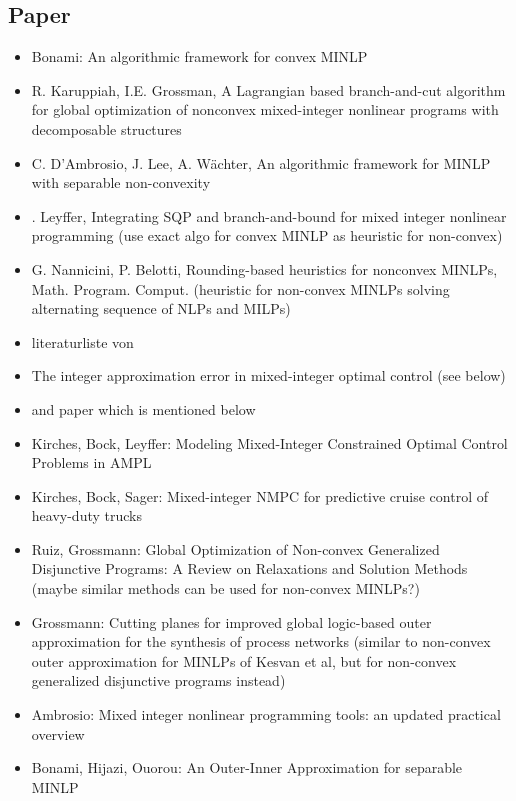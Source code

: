 \documentclass{article}
\begin{document}
\subsection{Paper}
\begin{itemize}
\item Bonami: An algorithmic framework for convex MINLP
\item R. Karuppiah, I.E. Grossman, A Lagrangian based branch-and-cut algorithm
for global optimization of nonconvex mixed-integer nonlinear programs
with decomposable structures
\item C. D’Ambrosio, J. Lee, A. W\"achter, An algorithmic framework for MINLP with
separable non-convexity
\item . Leyffer, Integrating SQP and branch-and-bound for mixed integer
nonlinear programming (use exact algo for convex MINLP as heuristic for non-convex)
\item G. Nannicini, P. Belotti, Rounding-based heuristics for nonconvex MINLPs,
Math. Program. Comput. (heuristic for non-convex MINLPs solving alternating sequence of NLPs and MILPs)
\item literaturliste von \cite{burer2012non}
\item The integer approximation error in mixed-integer optimal control (see below)
\item and paper which is mentioned below
\item Kirches, Bock, Leyffer: Modeling Mixed-Integer Constrained
Optimal Control Problems in AMPL
\item Kirches, Bock, Sager: Mixed-integer NMPC for predictive cruise control of heavy-duty trucks
\item Ruiz, Grossmann: Global Optimization of Non-convex Generalized
Disjunctive Programs: A Review on Relaxations and Solution Methods (maybe similar methods can be used for non-convex MINLPs?)
\item Grossmann: Cutting planes for improved global logic-based outer approximation
for the synthesis of process networks (similar to non-convex outer approximation for MINLPs of Kesvan et al, but for non-convex generalized disjunctive programs instead)
\item Ambrosio: Mixed integer nonlinear programming tools: an updated practical overview
\item Bonami, Hijazi, Ouorou: An Outer-Inner Approximation for separable MINLP
\end{itemize}
\end{document}
